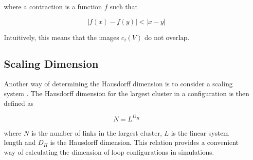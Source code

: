\noindent where a contraction is a function $f$ such that

\begin{equation}
    |f(x) - f(y)| < |x - y|
\end{equation}

\noindent Intuitively, this means that the images $c_i(V)$ do not overlap.

\subsection{Scaling Dimension}
\label{subsec:ScalingDimension}

Another way of determining the Hausdorff dimension is to consider a scaling system \cite{Camarda:MethodsDetermineHausdorff}. The Hausdorff dimension for the largest cluster in a configuration is then defined as

\begin{equation}
    N = L^{D_H}
\end{equation}

\noindent where $N$ is the number of links in the largest cluster, $L$ is the linear system length and $D_H$ is the Hausdorff dimension. This relation provides a convenient way of calculating the dimension of loop configurations in simulations.


